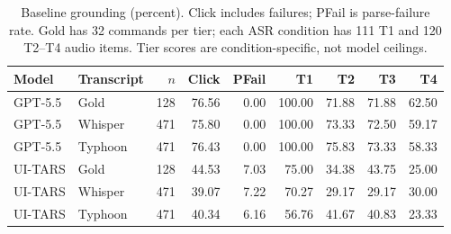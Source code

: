 \begin{table}[t]
\centering
\caption{Baseline grounding (percent). Click includes failures; PFail is parse-failure rate. Gold has 32 commands per tier; each ASR condition has 111 T1 and 120 T2--T4 audio items. Tier scores are condition-specific, not model ceilings.}
\label{tab:grounding}
\small
\begin{tabular}{llrrrrrrr}
\toprule
Model & Transcript & $n$ & Click & PFail & T1 & T2 & T3 & T4 \\
\midrule
GPT-5.5 & Gold & 128 & 76.56 & 0.00 & 100.00 & 71.88 & 71.88 & 62.50 \\
GPT-5.5 & Whisper & 471 & 75.80 & 0.00 & 100.00 & 73.33 & 72.50 & 59.17 \\
GPT-5.5 & Typhoon & 471 & 76.43 & 0.00 & 100.00 & 75.83 & 73.33 & 58.33 \\
UI-TARS & Gold & 128 & 44.53 & 7.03 & 75.00 & 34.38 & 43.75 & 25.00 \\
UI-TARS & Whisper & 471 & 39.07 & 7.22 & 70.27 & 29.17 & 29.17 & 30.00 \\
UI-TARS & Typhoon & 471 & 40.34 & 6.16 & 56.76 & 41.67 & 40.83 & 23.33 \\
\bottomrule
\end{tabular}
\end{table}
